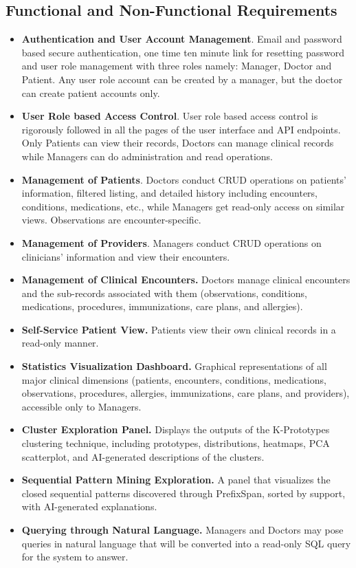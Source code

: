 \subsection{Functional and Non-Functional Requirements}
\begin{itemize}
    \item \textbf{Authentication and User Account Management}. Email and password based secure authentication, one time ten minute link for resetting password and user role management with three roles namely: Manager, Doctor and Patient. Any user role account can be created by a manager, but the doctor can create patient accounts only.
    \item \textbf{User Role based Access Control}. User role based access control is rigorously followed in all the pages of the user interface and API endpoints. Only Patients can view their records, Doctors can manage clinical records while Managers can do administration and read operations.
    \item \textbf{Management of Patients}. Doctors conduct CRUD operations on patients' information, filtered listing, and detailed history including encounters, conditions, medications, etc., while Managers get read-only access on similar views. Observations are encounter-specific.
    \item \textbf{Management of Providers}. Managers conduct CRUD operations on clinicians' information and view their encounters.
    \item \textbf{Management of Clinical Encounters.} Doctors manage clinical encounters and the sub-records associated with them (observations, conditions, medications, procedures, immunizations, care plans, and allergies).
    \item \textbf{Self-Service Patient View.} Patients view their own clinical records in a read-only manner.
    \item \textbf{Statistics Visualization Dashboard.} Graphical representations of all major clinical dimensions (patients, encounters, conditions, medications, observations, procedures, allergies, immunizations, care plans, and providers), accessible only to Managers.
    \item \textbf{Cluster Exploration Panel.} Displays the outputs of the K-Prototypes clustering technique, including prototypes, distributions, heatmaps, PCA scatterplot, and AI-generated descriptions of the clusters.
    \item \textbf{Sequential Pattern Mining Exploration.} A panel that visualizes the closed sequential patterns discovered through PrefixSpan, sorted by support, with AI-generated explanations.
    \item \textbf{Querying through Natural Language.} Managers and Doctors may pose queries in natural language that will be converted into a read-only SQL query for the system to answer.
\end{itemize}

